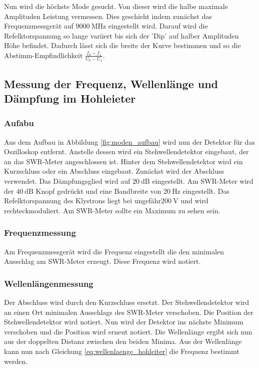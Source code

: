Nun wird die höchste Mode gesucht.
Von dieser wird die halbe maximale Amplituden Leistung vermessen.
Dies geschieht indem zunächst das Frequenzmessgerät auf $\SI{9000}{\mega\Hz}$ eingestellt wird.
Darauf wird die Refelktorspannung so lange variiert bis sich der 'Dip' auf halber Amplituden Höhe befindet.
Dadurch lässt sich die breite der Kurve bestimmen und so die Abstimm-Empfindlichkeit $\frac{f_0 - f_1}{U_0 - U_1}$.

\subsection{Messung der Frequenz, Wellenlänge und Dämpfung im Hohleieter}
\subsubsection{Aufabu}
\label{sec:aufbau}
Aus dem Aufbau in Abbildung \ref{fig:moden_aufbau} wird nun der Detektor für das Oszilloskop entfernt.
Anstelle dessen wird ein Stehwellendetektor eingebaut, der an das SWR-Meter angeschlossen ist.
Hinter dem Stehwellendetektor wird ein Kurzschluss oder ein Abschluss eingebaut.
Zunächst wird der Abschluss verwendet.
Das Dämpfungsglied wird auf $\SI{20}{\dB}$ eingestellt.
Am SWR-Meter wird der $\SI{40}{\dB}$ Knopf gedrückt und eine Bandbreite von $\SI{20}{\Hz}$ eingestellt.
Das Refelktorspannung des Klystrons liegt bei ungefähr$ \SI{200}{\V}$ und wird rechteckmoduliert.
Am SWR-Meter sollte ein Maximum zu sehen sein.

\subsubsection{Frequenzmessung}
Am Frequenzmessgerät wird die Frequenz eingestellt die den minimalen Ausschlag am SWR-Meter erzeugt.
Diese Frequenz wird notiert.

\subsubsection{Wellenlängenmessung}
Der Abschluss wird durch den Kurzschluss ersetzt.
Der Stehwellendetektor wird an einen Ort minimalen Ausschlags des SWR-Meter verschoben.
Die Position der Stehwellendetektor wird notiert.
Nun wird der Detektor ins nächste Minimum verschoben und die Position wird erneut notiert.
Die Wellenlänge ergibt sich nun aus der doppelten Distanz zwischen den beiden Minima.
Aus der Wellenlänge kann nun nach Gleichung \ref{eq:wellenlaenge_hohleiter} die Frequenz bestimmt werden.

